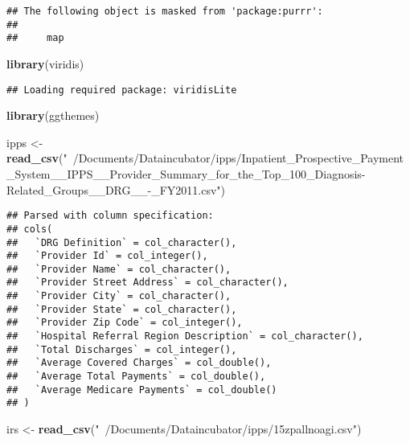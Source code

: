 \documentclass[]{article}
\newenvironment{Shaded}{\begin{snugshade}}{\end{snugshade}}
\newcommand{\KeywordTok}[1]{\textcolor[rgb]{0.13,0.29,0.53}{\textbf{#1}}}
\newcommand{\StringTok}[1]{\textcolor[rgb]{0.31,0.60,0.02}{#1}}
\newcommand{\NormalTok}[1]{#1}
\begin{document}
\begin{verbatim}
## The following object is masked from 'package:purrr':
## 
##     map
\end{verbatim}

\begin{Shaded}
\begin{Highlighting}[]
\KeywordTok{library}\NormalTok{(viridis)}
\end{Highlighting}
\end{Shaded}

\begin{verbatim}
## Loading required package: viridisLite
\end{verbatim}

\begin{Shaded}
\begin{Highlighting}[]
\KeywordTok{library}\NormalTok{(ggthemes)}
\end{Highlighting}
\end{Shaded}

\begin{Shaded}
\begin{Highlighting}[]
\NormalTok{ipps <-}\StringTok{ }\KeywordTok{read_csv}\NormalTok{(}\StringTok{"~/Documents/Dataincubator/ipps/Inpatient_Prospective_Payment_System__IPPS__Provider_Summary_for_the_Top_100_Diagnosis-Related_Groups__DRG__-_FY2011.csv"}\NormalTok{)}
\end{Highlighting}
\end{Shaded}

\begin{verbatim}
## Parsed with column specification:
## cols(
##   `DRG Definition` = col_character(),
##   `Provider Id` = col_integer(),
##   `Provider Name` = col_character(),
##   `Provider Street Address` = col_character(),
##   `Provider City` = col_character(),
##   `Provider State` = col_character(),
##   `Provider Zip Code` = col_integer(),
##   `Hospital Referral Region Description` = col_character(),
##   `Total Discharges` = col_integer(),
##   `Average Covered Charges` = col_double(),
##   `Average Total Payments` = col_double(),
##   `Average Medicare Payments` = col_double()
## )
\end{verbatim}

\begin{Shaded}
\begin{Highlighting}[]
\NormalTok{irs <-}\StringTok{ }\KeywordTok{read_csv}\NormalTok{(}\StringTok{"~/Documents/Dataincubator/ipps/15zpallnoagi.csv"}\NormalTok{)}
\end{Highlighting}
\end{Shaded}
\end{document}

